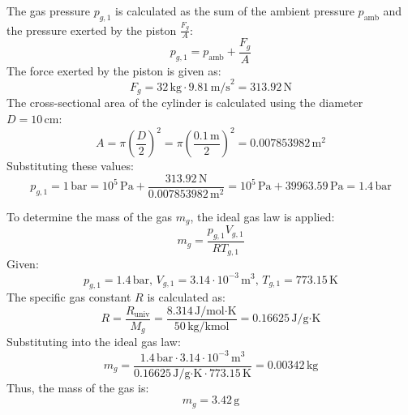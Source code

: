 The gas pressure \( p_{g,1} \) is calculated as the sum of the ambient pressure \( p_{\text{amb}} \) and the pressure exerted by the piston \( \frac{F_g}{A} \):  
\[
p_{g,1} = p_{\text{amb}} + \frac{F_g}{A}
\]  
The force exerted by the piston is given as:  
\[
F_g = 32 \, \text{kg} \cdot 9.81 \, \text{m/s}^2 = 313.92 \, \text{N}
\]  
The cross-sectional area of the cylinder is calculated using the diameter \( D = 10 \, \text{cm} \):  
\[
A = \pi \left( \frac{D}{2} \right)^2 = \pi \left( \frac{0.1 \, \text{m}}{2} \right)^2 = 0.007853982 \, \text{m}^2
\]  
Substituting these values:  
\[
p_{g,1} = 1 \, \text{bar} = 10^5 \, \text{Pa} + \frac{313.92 \, \text{N}}{0.007853982 \, \text{m}^2} = 10^5 \, \text{Pa} + 39963.59 \, \text{Pa} = 1.4 \, \text{bar}
\]  

To determine the mass of the gas \( m_g \), the ideal gas law is applied:  
\[
m_g = \frac{p_{g,1} V_{g,1}}{R T_{g,1}}
\]  
Given:  
\[
p_{g,1} = 1.4 \, \text{bar}, \, V_{g,1} = 3.14 \cdot 10^{-3} \, \text{m}^3, \, T_{g,1} = 773.15 \, \text{K}
\]  
The specific gas constant \( R \) is calculated as:  
\[
R = \frac{R_{\text{univ}}}{M_g} = \frac{8.314 \, \text{J/mol·K}}{50 \, \text{kg/kmol}} = 0.16625 \, \text{J/g·K}
\]  
Substituting into the ideal gas law:  
\[
m_g = \frac{1.4 \, \text{bar} \cdot 3.14 \cdot 10^{-3} \, \text{m}^3}{0.16625 \, \text{J/g·K} \cdot 773.15 \, \text{K}} = 0.00342 \, \text{kg}
\]  
Thus, the mass of the gas is:  
\[
m_g = 3.42 \, \text{g}
\]